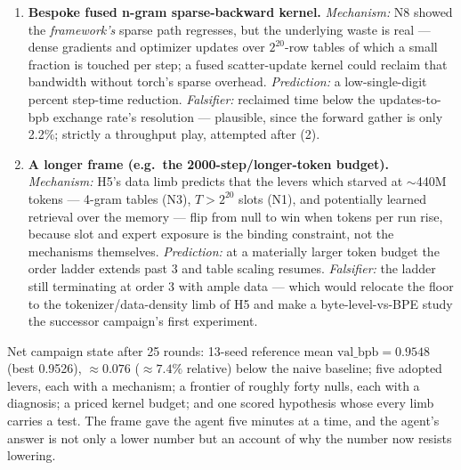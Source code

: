 \documentclass{article}
\newcommand{\valbpb}{\mathrm{val\_bpb}}
\begin{document}
\begin{enumerate}
    \item \textbf{Bespoke fused n-gram sparse-backward kernel.} \emph{Mechanism:} N8 showed the \emph{framework's} sparse path regresses, but the underlying waste is real --- dense gradients and optimizer updates over $2^{20}$-row tables of which a small fraction is touched per step; a fused scatter-update kernel could reclaim that bandwidth without torch's sparse overhead. \emph{Prediction:} a low-single-digit percent step-time reduction. \emph{Falsifier:} reclaimed time below the updates-to-bpb exchange rate's resolution --- plausible, since the forward gather is only 2.2\%; strictly a throughput play, attempted after (2).
    \item \textbf{A longer frame (e.g.\ the 2000-step/longer-token budget).} \emph{Mechanism:} H5's data limb predicts that the levers which starved at $\sim$440M tokens --- 4-gram tables (N3), $T > 2^{20}$ slots (N1), and potentially learned retrieval over the memory --- flip from null to win when tokens per run rise, because slot and expert exposure is the binding constraint, not the mechanisms themselves. \emph{Prediction:} at a materially larger token budget the order ladder extends past 3 and table scaling resumes. \emph{Falsifier:} the ladder still terminating at order 3 with ample data --- which would relocate the floor to the tokenizer/data-density limb of H5 and make a byte-level-vs-BPE study the successor campaign's first experiment.
\end{enumerate}

Net campaign state after 25 rounds: 13-seed reference mean $\valbpb = 0.9548$ (best 0.9526), $\approx 0.076$ ($\approx 7.4\%$ relative) below the naive baseline; five adopted levers, each with a mechanism; a frontier of roughly forty nulls, each with a diagnosis; a priced kernel budget; and one scored hypothesis whose every limb carries a test. The frame gave the agent five minutes at a time, and the agent's answer is not only a lower number but an account of why the number now resists lowering.


\end{document}
